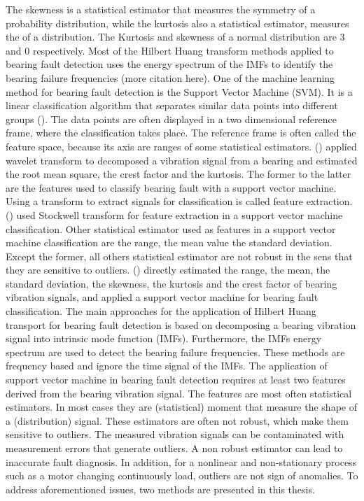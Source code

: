 \documentclass[../Main/thesis.tex]{subfiles}
\begin{document}
The skewness is a statistical estimator that measures the symmetry of a probability distribution, while the kurtosis also a statistical estimator, measures the  of a distribution. The Kurtosis and skewness of a normal distribution are 3 and 0 respectively.
Most of the Hilbert Huang transform methods applied to bearing fault detection uses the energy spectrum of the IMFs to identify the bearing failure frequencies (more citation here).
\justify
One of the machine learning method for bearing fault detection is the Support Vector Machine (SVM). It is a linear classification algorithm that separates similar data points into different groups (\cite{vapnik1995}). The data points are  often displayed in a two dimensional reference frame, where the classification takes place. The reference frame is often called the feature space, because its axis are ranges of some statistical estimators. (\cite{konar2011}) applied wavelet transform to decomposed a vibration signal from a bearing and estimated the root mean square, the crest factor and the kurtosis. The former to the latter are the features used to classify bearing fault with a support vector machine. Using a transform to extract signals for classification is called feature extraction. (\cite{singh2018}) used Stockwell transform for feature extraction in a support vector machine classification. Other statistical estimator used as features in a support vector machine classification are the range, the mean value the standard deviation. Except the former, all others statistical estimator are not robust in the sens that they are sensitive to outliers. (\cite{kankar2010}) directly estimated the range, the mean, the standard deviation, the skewness, the kurtosis and the crest factor of bearing vibration signals, and applied a support vector machine for bearing fault classification.
\justify
The main approaches for the application of Hilbert Huang transport for bearing fault detection is based on decomposing a bearing vibration signal into intrinsic mode function (IMFs). Furthermore, the IMFs energy spectrum are used to detect the bearing failure frequencies. These methods are frequency based and ignore the time signal of the IMFs.
\justify
The application of support vector machine in bearing fault detection requires at least two features derived from the bearing vibration signal. The features are most often statistical estimators. In most cases they are (statistical) moment that measure the shape of a (distribution) signal. These estimators are often not robust, which make them sensitive to outliers. The measured vibration signals can be contaminated with measurement errors that generate outliers. A non robust estimator can lead to inaccurate fault diagnosis. In addition, for a nonlinear and non-stationary process such as a motor changing continuously load, outliers are not sign of anomalies. To address aforementioned issues, two methods are presented in this thesis. 
\end{document}
